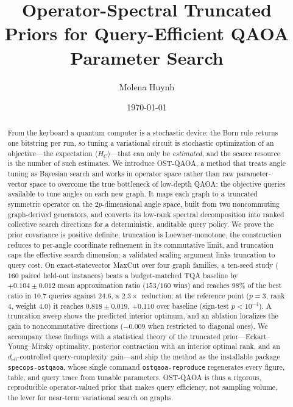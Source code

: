 \documentclass[aps,prxquantum,reprint,amsmath,amssymb,floatfix,nofootinbib,superscriptaddress,longbibliography]{revtex4-2}
\theoremstyle{remark}
\newcommand{\QAOA}{\textnormal{\textsc{QAOA}}}
\newcommand{\OSTQAOA}{\textnormal{\textsc{OST-QAOA}}}
\newcommand{\TQA}{\textnormal{\textsc{TQA}}}
\begin{document}
\title{Operator-Spectral Truncated Priors for Query-Efficient QAOA Parameter Search}

\author{Molena Huynh}

\date{\today}

\begin{abstract}
From the keyboard a quantum computer is a stochastic device: the Born rule returns
one bitstring per run, so tuning a variational circuit is stochastic optimization
of an objective---the expectation \(\langle H_C\rangle\)---that can only be
\emph{estimated}, and the scarce resource is the number of such estimates.
We introduce \OSTQAOA{}, a method that treats angle tuning as Bayesian search and
works in operator space rather than raw parameter-vector space to overcome the true
bottleneck of low-depth \QAOA{}:
the objective queries available to tune angles on each new graph.  It maps each
graph to a truncated symmetric operator on the \(2p\)-dimensional angle space,
built from two noncommuting graph-derived generators, and converts its low-rank
spectral decomposition into ranked collective search directions for a
deterministic, auditable query policy.  We prove the prior covariance is positive
definite, truncation is Loewner-monotone, the construction reduces to
per-angle coordinate refinement in its commutative limit, and truncation caps the
effective search dimension; a validated scaling argument links truncation to
query cost.  On exact-statevector MaxCut over four graph families, a ten-seed
study (\(160\) paired held-out instances) beats a budget-matched \TQA{} baseline
by \(+0.104\pm0.012\) mean approximation ratio (\(153/160\) wins) and reaches
\(98\%\) of the best ratio in \(10.7\) queries against \(24.6\), a \(2.3\times\)
reduction; at the reference point (\(p{=}3\), rank \(4\), weight \(4.0\)) it
reaches \(0.818\pm0.019\), \(+0.110\) over baseline (sign-test \(p<10^{-4}\)).  A
truncation sweep shows the predicted interior optimum, and an ablation localizes
the gain to noncommutative directions (\(-0.009\) when restricted to diagonal
ones).  We accompany these findings with a statistical theory of the truncated
prior---Eckart--Young--Mirsky optimality, posterior contraction with an interior
optimal rank, and an \(d_{\mathrm{eff}}\)-controlled query-complexity gain---and
ship the method as the installable package \texttt{specops-ostqaoa}, whose single
command \texttt{ostqaoa-reproduce} regenerates every figure, table, and query
trace from tunable parameters.  \OSTQAOA{} is thus a rigorous, reproducible
operator-valued prior that makes query efficiency, not sampling volume, the
lever for near-term variational search on graphs.
\end{abstract}
\end{document}
